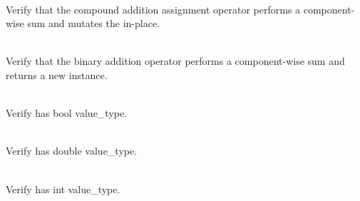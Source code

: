 \begin{DoxyRefList}
\item[{\parbox[t]{\linewidth}{Member \doxylink{group___f_g_m___vec4___addition_gaef184c525ed937069f321fd4615d3172}{Vector4\+DAddition\+\_\+\+Plus\+Equals\+Operator\+\_\+\+Returns\+Same\+Vector\+With\+Sum} ()}}]\hfill \\
\label{test__test000018}%
%
Verify that the compound addition assignment operator performs a component-\/wise sum and mutates the  in-\/place.  
\item[{\parbox[t]{\linewidth}{Member \doxylink{group___f_g_m___vec4___addition_gaf200031d73ef67d47cf746aa952ed395}{Vector4\+DAddition\+\_\+\+Plus\+Operator\+\_\+\+Returns\+Vector\+Sum} ()}}]\hfill \\
\label{test__test000017}%
%
Verify that the binary addition operator performs a component-\/wise sum and returns a new  instance.  
\item[{\parbox[t]{\linewidth}{Member \doxylink{group___f_g_m___vec4___alias_ga28601b44441df93dee398b8df1d2605a}{Vector4\+DAlias\+\_\+b\+Vec4\+Is\+A4\+DBool\+Vector} ()}}]\hfill \\
\label{test__test000010}%
%
Verify  has bool value\+\_\+type.  
\item[{\parbox[t]{\linewidth}{Member \doxylink{group___f_g_m___vec4___alias_ga91ab0c5b95623fdad74785285938d1f7}{Vector4\+DAlias\+\_\+d\+Vec4\+Is\+A4\+DDouble\+Vector} ()}}]\hfill \\
\label{test__test000015}%
%
Verify  has double value\+\_\+type.  
\item[{\parbox[t]{\linewidth}{Member \doxylink{group___f_g_m___vec4___alias_ga29418d11dd5b9b8c0cfb94df27275df0}{Vector4\+DAlias\+\_\+i\+Vec4\+Is\+A4\+DInt\+Vector} ()}}]\hfill \\
\label{test__test000011}%
%
Verify  has int value\+\_\+type.  
\item[{\parbox[t]{\linewidth}{Member \doxylink{group___f_g_m___vec4___alias_ga9d78ac901bc808372b0a9471607a32fd}{Vector4\+DAlias\+\_\+l\+Vec4\+Is\+A4\+DLong\+Long\+Vector} ()}}]\hfill \\
\label{test__test000014}%
%

\end{DoxyRefList}
